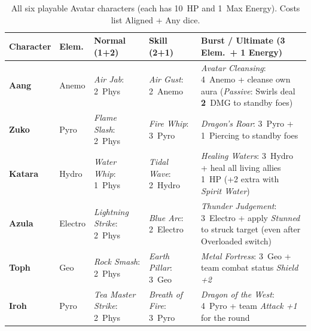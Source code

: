 \documentclass[11pt,a4paper]{article}
\begin{document}
\begin{table}[H]
\centering
\caption{All six playable Avatar characters (each has 10~HP and 1~Max Energy). Costs list Aligned + Any dice.}
\label{tab:characters}
\small
\begin{tabularx}{\textwidth}{@{}L{1.45cm} L{1.2cm} L{2.95cm} L{2.75cm} Y@{}}
\toprule
Character & Elem. & Normal (1+2) & Skill (2+1) & Burst / Ultimate (3 Elem.\ + 1 Energy) \\
\midrule
\textbf{Aang} & Anemo & \emph{Air Jab}: 2~Phys & \emph{Air Gust}: 2~Anemo & \emph{Avatar Cleansing}: 4~Anemo + cleanse own aura (\emph{Passive}: Swirls deal \textbf{2}~DMG to standby foes) \\
\textbf{Zuko} & Pyro & \emph{Flame Slash}: 2~Phys & \emph{Fire Whip}: 3~Pyro & \emph{Dragon's Roar}: 3~Pyro + 1~Piercing to standby foes \\
\textbf{Katara} & Hydro & \emph{Water Whip}: 1~Phys & \emph{Tidal Wave}: 2~Hydro & \emph{Healing Waters}: 3~Hydro + heal all living allies 1~HP (+2 extra with \emph{Spirit Water}) \\
\textbf{Azula} & Electro & \emph{Lightning Strike}: 2~Phys & \emph{Blue Arc}: 2~Electro & \emph{Thunder Judgement}: 3~Electro + apply \emph{Stunned} to struck target (even after Overloaded switch) \\
\textbf{Toph} & Geo & \emph{Rock Smash}: 2~Phys & \emph{Earth Pillar}: 3~Geo & \emph{Metal Fortress}: 3~Geo + team combat status \emph{Shield +2} \\
\textbf{Iroh} & Pyro & \emph{Tea Master Strike}: 2~Phys & \emph{Breath of Fire}: 3~Pyro & \emph{Dragon of the West}: 4~Pyro + team \emph{Attack +1} for the round \\
\bottomrule
\end{tabularx}
\end{table}
\end{document}
